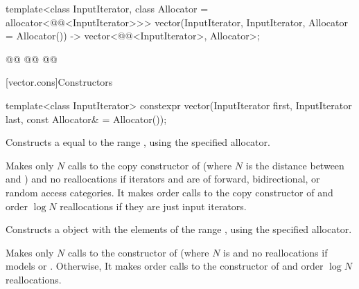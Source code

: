 \documentclass{wg21}
\begin{document}
\begin{codeblock}
{    template<class InputIterator, class Allocator = allocator<@@<InputIterator>>>
    vector(InputIterator, InputIterator, Allocator = Allocator())
    -> vector<@@<InputIterator>, Allocator>;
    
    @@
    @@
    @@
}
\end{codeblock}%
[vector.cons]{Constructors}


\begin{itemdecl}
    template<class InputIterator>
    constexpr vector(InputIterator first, InputIterator last,
    const Allocator& = Allocator());
\end{itemdecl}

\begin{itemdescr}
    
    \pnum
    \effects
    Constructs a  equal to the
    range , using the specified allocator.
    
    \pnum
    \complexity
    Makes only $N$
    calls to the copy constructor of
    (where $N$
    is the distance between
    and
    )
    and no reallocations if iterators  and  are of forward, bidirectional, or random access categories.
    It makes order
    calls to the copy constructor of
    and order
    $\log N$
    reallocations if they are just input iterators.
\end{itemdescr}

\begin{addedblock}
\begin{itemdecl}
template<@@ R>}
vector(from_range_t, R&& range, const Allocator& = Allocator());
\end{itemdecl}

\begin{itemdescr}
    \pnum
    \effects
    Constructs a  object with the elements of the range , using the specified allocator.
    
    \pnum
   \complexity
   Makes only $N$ calls to the constructor of  (where $N$ is 
   and no reallocations if  models  or .
   Otherwise, It makes order  calls to the constructor of  and order $\log N$ reallocations.
\end{itemdescr}
\end{addedblock}
\end{document}
